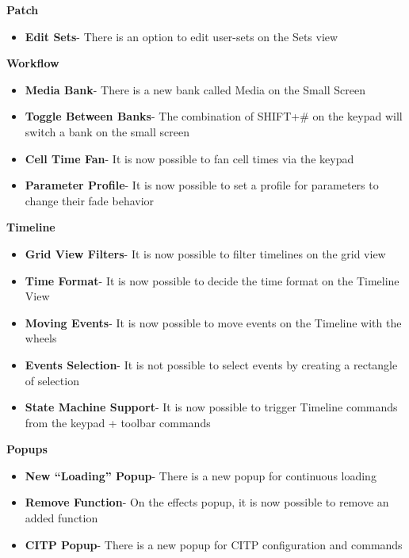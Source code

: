 \documentclass[
]{article}
\providecommand{\tightlist}{%
  \setlength{\itemsep}{0pt}\setlength{\parskip}{0pt}}
\begin{document}
\textbf{Patch}

\begin{itemize}
\tightlist
\item
  \textbf{Edit Sets}- There is an option to edit user-sets on the Sets view
\end{itemize}

\textbf{Workflow}

\begin{itemize}
\item
  \textbf{Media Bank}- There is a new bank called Media on the Small Screen
\item
  \textbf{Toggle Between Banks}- The combination of SHIFT+\# on the keypad will switch a bank on the small screen
\item
  \textbf{Cell Time Fan}- It is now possible to fan cell times via the keypad
\item
  \textbf{Parameter Profile}- It is now possible to set a profile for parameters to change their fade behavior
\end{itemize}

\textbf{Timeline}

\begin{itemize}
\item
  \textbf{Grid View Filters}- It is now possible to filter timelines on the grid view
\item
  \textbf{Time Format}- It is now possible to decide the time format on the Timeline View
\item
  \textbf{Moving Events}- It is now possible to move events on the Timeline with the wheels
\item
  \textbf{Events Selection}- It is not possible to select events by creating a rectangle of selection
\item
  \textbf{State Machine Support}- It is now possible to trigger Timeline commands from the keypad + toolbar commands
\end{itemize}

\textbf{Popups}

\begin{itemize}
\item
  \textbf{New ``Loading'' Popup}- There is a new popup for continuous loading
\item
  \textbf{Remove Function}- On the effects popup, it is now possible to remove an added function
\item
  \textbf{CITP Popup}- There is a new popup for CITP configuration and commands
\end{itemize}
\end{document}
